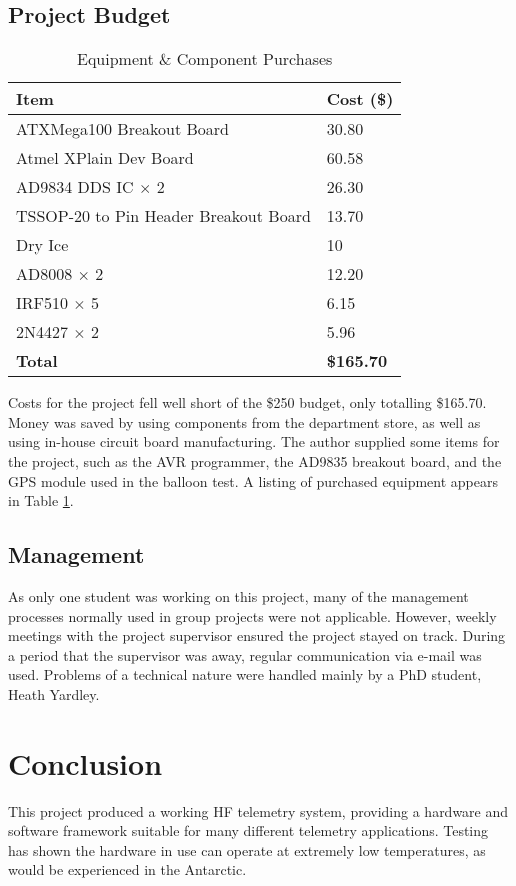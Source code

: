 \documentclass[a4paper,12pt]{article}
\begin{document}
\subsection{Project Budget}
\begin{table}[h]
\begin{center}
\caption{Equipment \& Component Purchases}
\begin{tabular}{l|l}
\hline
\textbf{Item} & \textbf{Cost (\$)}\\
\hline
ATXMega100 Breakout Board & 30.80\\
Atmel XPlain Dev Board & 60.58\\
AD9834 DDS IC $\times$ 2 & 26.30\\
TSSOP-20 to Pin Header Breakout Board & 13.70\\
Dry Ice & 10\\
AD8008 $\times$ 2 & 12.20\\
IRF510 $\times$ 5 & 6.15\\
2N4427 $\times$ 2 & 5.96\\
\hline
\textbf{Total} & \textbf{\$165.70}\\
\end{tabular}
\end{center}
\label{proj_costs}
\end{table}
Costs for the project fell well short of the \$250 budget, only totalling \$165.70. Money was saved by using components from the department store, as well as using in-house circuit board manufacturing. The author supplied some items for the project, such as the AVR programmer, the AD9835 breakout board, and the GPS module used in the balloon test. A listing of purchased equipment appears in Table \ref{proj_costs}.

\subsection{Management}
As only one student was working on this project, many of the management processes normally used in group projects were not applicable. However, weekly meetings with the project supervisor ensured the project stayed on track. During a period that the supervisor was away, regular communication via e-mail was used. Problems of a technical nature were handled mainly by a PhD student, Heath Yardley.

\section{Conclusion}
This project produced a working HF telemetry system, providing a hardware and software framework suitable for many different telemetry applications. Testing has shown the hardware in use can operate at extremely low temperatures, as would be experienced in the Antarctic.
\end{document}
